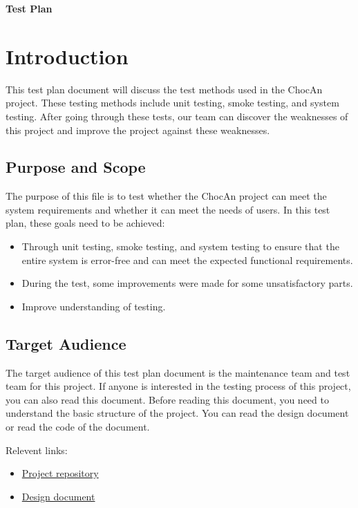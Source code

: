\documentclass{article}
\renewcommand{\maketitle}{
   \begin{center}
      {\Huge \bfseries Test Plan}
   \end{center}
}
\begin{document}
\maketitle
\tableofcontents
\pagebreak

\section{Introduction}
This test plan document will discuss the test methods used in the ChocAn
project. These testing methods include unit testing, smoke testing, and system
testing. After going through these tests, our team can discover the weaknesses
of this project and improve the project against these weaknesses.

\subsection{Purpose and Scope}
The purpose of this file is to test whether the ChocAn project can meet the
system requirements and whether it can meet the needs of users. In this test
plan, these goals need to be achieved:

\begin{itemize}
   \item Through unit testing, smoke testing, and system testing to ensure that the
      entire system is error-free and can meet the expected functional requirements.
   \item During the test, some improvements were made for some unsatisfactory parts.
   \item Improve understanding of testing.
\end{itemize}

\subsection{Target Audience}
The target audience of this test plan document is the maintenance team and test
team for this project. If anyone is interested in the testing process of this project,
you can also read this document. Before reading this document, you need to
understand the basic structure of the project. You can read the design document
or read the code of the document.

Relevent links:
\begin{itemize}
   \item \href{https://github.com/aujxn/CS300}{Project repository}
   \item \href{https://github.com/aujxn/CS300/documents/design.tex}{Design document}
\end{itemize}
\end{document}
